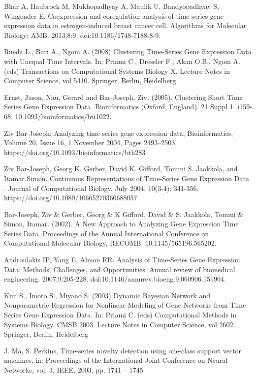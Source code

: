 \begin{thebibliography}{19}
 Bhar A, Haubrock M, Mukhopadhyay A, Maulik U, Bandyopadhyay S, Wingender E. Coexpression and coregulation analysis of time-series gene expression data in estrogen-induced breast cancer cell. Algorithms for Molecular Biology: AMB. 2013;8:9. doi:10.1186/1748-7188-8-9.

 Rueda L., Bari A., Ngom A. (2008) Clustering Time-Series Gene Expression Data with Unequal Time Intervals. In: Priami C., Dressler F., Akan O.B., Ngom A. (eds) Transactions on Computational Systems Biology X. Lecture Notes in Computer Science, vol 5410. Springer, Berlin, Heidelberg

 Ernst, Jason, Nau, Gerard and Bar-Joseph, Ziv. (2005). Clustering Short Time Series Gene Expression Data. Bioinformatics (Oxford, England). 21 Suppl 1. i159-68. 10.1093/bioinformatics/bti1022. 

 Ziv Bar-Joseph; Analyzing time series gene expression data, Bioinformatics, Volume 20, Issue 16, 1 November 2004, Pages 2493–2503, https://doi.org/10.1093/bioinformatics/bth283

 Ziv Bar-Joseph, Georg K. Gerber, David K. Gifford, Tommi S. Jaakkola, and Itamar Simon. Continuous Representations of Time-Series Gene Expression Data . Journal of Computational Biology. July 2004, 10(3-4): 341-356. https://doi.org/10.1089/10665270360688057

 Bar-Joseph, Ziv \& Gerber, Georg \& K Gifford, David \& S. Jaakkola, Tommi \& Simon, Itamar. (2002). A New Approach to Analyzing Gene Expression Time Series Data. Proceedings of the Annual International Conference on Computational Molecular Biology, RECOMB. 10.1145/565196.565202. 

 Androulakis IP, Yang E, Almon RR. Analysis of Time-Series Gene Expression Data: Methods, Challenges, and Opportunities. Annual review of biomedical engineering. 2007;9:205-228. doi:10.1146/annurev.bioeng.9.060906.151904.

 Kim S., Imoto S., Miyano S. (2003) Dynamic Bayesian Network and Nonparametric Regression for Nonlinear Modeling of Gene Networks from Time Series Gene Expression Data. In: Priami C. (eds) Computational Methods in Systems Biology. CMSB 2003. Lecture Notes in Computer Science, vol 2602. Springer, Berlin, Heidelberg

 J. Ma, S. Perkins, Time-series novelty detection using one-class
support vector machines, in: Proceedings of the International Joint
Conference on Neural Networks, vol. 3, IEEE, 2003, pp. 1741
–
1745


\end{thebibliography}
